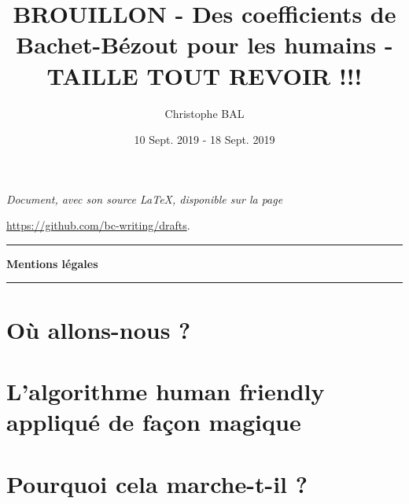 \documentclass[12pt]{amsart}
\begin{document}
\title{BROUILLON - Des coefficients de Bachet-Bézout pour les humains - TAILLE TOUT REVOIR !!!}
\author{Christophe BAL}
\date{10 Sept. 2019 - 18 Sept. 2019}

\maketitle

\begin{center}
    \itshape
    Document, avec son source \LaTeX, disponible sur la page
    
    \url{https://github.com/bc-writing/drafts}.
\end{center}


\bigskip


\begin{center}
    \hrule\vspace{.3em}
    {
        \fontsize{1.35em}{1em}\selectfont
        \textbf{Mentions \og légales \fg}
    }
            
    \vspace{0.45em}
    \doclicenseThis
    \hrule
\end{center}


\vspace{4em}


\setcounter{tocdepth}{2}
\tableofcontents




\newpage
\section{Où allons-nous ?}






\newpage
\section{L'algorithme \og human friendly \fg{} appliqué de façon magique}






\newpage
\section{Pourquoi cela marche-t-il ?}




\end{document}
